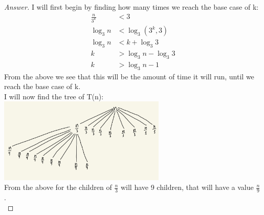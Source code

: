 \documentclass[11pt]{article}
\theoremstyle{definition}
\theoremstyle{definition}
\theoremstyle{definition}
\begin{document}
\begin{proof}[Answer]
I will first begin by finding how many times we reach the base case of k: \\
\begin{align*}
\frac{n}{3^k}  &< 3\\
\log_3 n &< \log_3 (3^k, 3) \\
\log_3 n&< k + \log_3 3 \\
k &> \log_3 n - \log_3 3  \\
k &> \log_3 n - 1
\end{align*}
From the above we see that this will be the amount of time it will run, until we reach the base case of k.\\

I will now find the tree of T(n): \\
\includegraphics[width=0.6\textwidth]{IMG_F40695BF3954-1.jpeg}\\
From the above for the children of $\frac{n}{3}$ will have 9 children, that will have a value $\frac{n}{9}$. \\


\end{proof}
\end{document}
